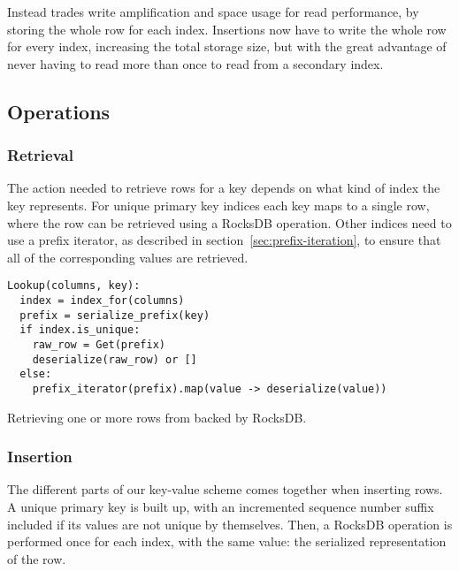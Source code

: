 Instead  trades write amplification and space usage for
read performance, by storing the whole row for each index. Insertions now have
to write the whole row for every index, increasing the total storage size, but
with the great advantage of never having to read more than once to read from a
secondary index.

\subsection{Operations}

\subsubsection{Retrieval}

The action needed to retrieve rows for a key depends on what kind of index the
key represents. For unique primary key indices each key maps to a single row,
where the row can be retrieved using a RocksDB  operation. Other
indices need to use a prefix iterator, as described in
section~\ref{sec:prefix-iteration}, to ensure that all of the corresponding
values are retrieved.

\begin{listing}[H]
  \begin{verbatim}
Lookup(columns, key):
  index = index_for(columns)
  prefix = serialize_prefix(key)
  if index.is_unique:
    raw_row = Get(prefix)
    deserialize(raw_row) or []
  else:
    prefix_iterator(prefix).map(value -> deserialize(value))
  \end{verbatim}

  \caption{Retrieving one or more rows from  backed by
  RocksDB.}\label{lst:rocksdb-lookup}
\end{listing}

\subsubsection{Insertion}

The different parts of our key-value scheme comes together when inserting rows.
A unique primary key is built up, with an incremented sequence number suffix
included if its values are not unique by themselves. Then, a RocksDB 
operation is performed once for each index, with the same value: the serialized
representation of the row.


